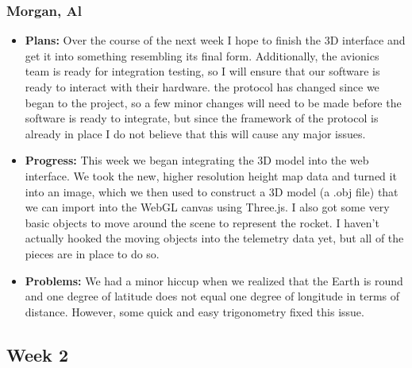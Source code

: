 \documentclass[10pt,draftclsnofoot,onecolumn]{IEEEtran}
\begin{document}
\subsubsection{Morgan, Al}
\begin{itemize}
	\item \textbf{Plans: }
	Over the course of the next week I hope to finish the 3D interface and get it into something resembling its final form. Additionally, the avionics team is ready for integration testing, so I will ensure that our software is ready to interact with their hardware. the protocol has changed since we began to the project, so a few minor changes will need to be made before the software is ready to integrate, but since the framework of the protocol is already in place I do not believe that this will cause any major issues.
	\item \textbf{Progress: }
	This week we began integrating the 3D model into the web interface. We took the new, higher resolution height map data and turned it into an image, which we then used to construct a 3D model (a .obj file) that we can import into the WebGL canvas using Three.js. I also got some very basic objects to move around the scene to represent the rocket. I haven't actually hooked the moving objects into the telemetry data yet, but all of the pieces are in place to do so.
	\item \textbf{Problems: }
	We had a minor hiccup when we realized that the Earth is round and one degree of latitude does not equal one degree of longitude in terms of distance. However, some quick and easy trigonometry fixed this issue.
\end{itemize}

\subsection{Week 2}
\end{document}
